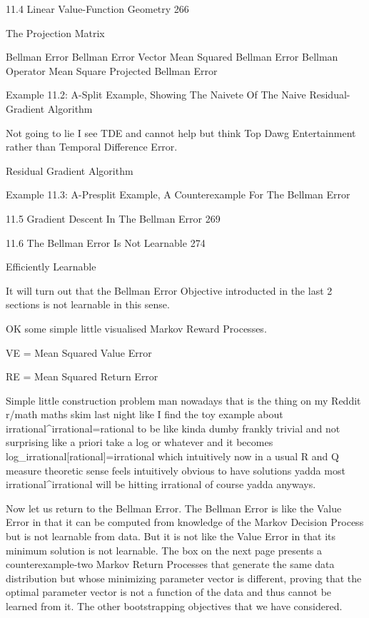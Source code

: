 11.4 Linear Value-Function Geometry 266

The Projection Matrix

Bellman Error
Bellman Error Vector
Mean Squared Bellman Error
Bellman Operator
Mean Square Projected Bellman Error

Example 11.2: A-Split Example, Showing The Naivete Of The Naive Residual-Gradient Algorithm

Not going to lie I see TDE and cannot help but think Top Dawg Entertainment rather than Temporal Difference Error.

Residual Gradient Algorithm

Example 11.3: A-Presplit Example, A Counterexample For The Bellman Error

11.5 Gradient Descent In The Bellman Error 269



11.6 The Bellman Error Is Not Learnable 274

Efficiently Learnable

It will turn out that the Bellman Error Objective introducted in the last 2 sections is not learnable in this sense.

OK some simple little visualised Markov Reward Processes.

VE = Mean Squared Value Error

RE = Mean Squared Return Error

Simple little construction problem man nowadays that is the thing on my Reddit r/math maths skim last night like I find the toy example about irrational^irrational=rational to be like kinda dumby frankly trivial and not surprising like a priori take a log or whatever and it becomes log_irrational[rational]=irrational which intuitively now in a usual R and Q measure theoretic sense feels intuitively obvious to have solutions yadda most irrational^irrational will be hitting irrational of course yadda anyways.

Now let us return to the Bellman Error. The Bellman Error is like the Value Error in that it can be computed from knowledge of the Markov Decision Process but is not learnable from data. But it is not like the Value Error in that its minimum solution is not learnable. The box on the next page presents a counterexample-two Markov Return Processes that generate the same data distribution but whose minimizing parameter vector is different, proving that the optimal parameter vector is not a function of the data and thus cannot be learned from it. The other bootstrapping objectives that we have considered.

